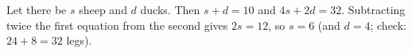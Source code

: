 Let there be $s$ sheep and $d$ ducks. Then $s+d=10$ and $4s+2d=32$. Subtracting twice the first equation from the second gives $2s=12$, so $s=\boxed{6}$ (and $d=4$; check: $24+8=32$ legs).
